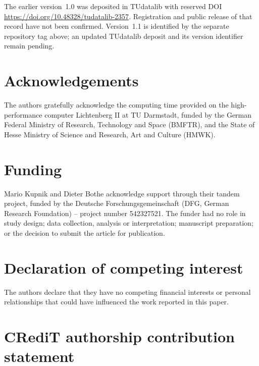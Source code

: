 \documentclass[final,12pt,nopreprintline,longtitle]{elsarticle}
\begin{document}
The earlier version~1.0 was deposited in TUdatalib with reserved DOI
\url{https://doi.org/10.48328/tudatalib-2357}.  Registration and public
release of that record have not been confirmed.  Version~1.1 is identified
by the separate repository tag above; an updated TUdatalib deposit and its
version identifier remain pending.

\section*{Acknowledgements}

The authors gratefully acknowledge the computing time provided on the
high-performance computer Lichtenberg II at TU Darmstadt, funded by the
German Federal Ministry of Research, Technology and Space (BMFTR), and the
State of Hesse Ministry of Science and Research, Art and Culture (HMWK).

\section*{Funding}

Mario Kupnik and Dieter Bothe acknowledge support through their tandem
project, funded by the Deutsche Forschungsgemeinschaft (DFG, German Research
Foundation) -- project number 542327521.
The funder had no role in study design; data collection, analysis or
interpretation; manuscript preparation; or the decision to submit the article
for publication.

\section*{Declaration of competing interest}

The authors declare that they have no competing financial interests or
personal relationships that could have influenced the work reported in this
paper.

\section*{CRediT authorship contribution statement}
\end{document}
